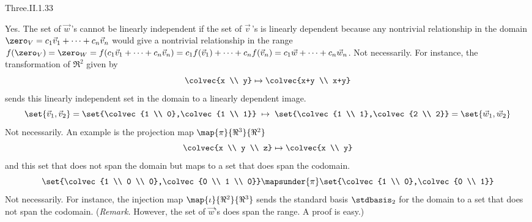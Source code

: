 \begin{ans}{Three.II.1.33}
      \begin{exparts}
        \partsitem Yes.
          The set of $\vec{w}\,$'s cannot be linearly independent if the
          set of $\vec{v}\,$'s is linearly dependent because
          any nontrivial relationship in the domain
          \( \zero_V=c_1\vec{v}_1+\dots+c_n\vec{v}_n \)
          would give a nontrivial relationship in the range
          \( f(\zero_V)=\zero_W=f(c_1\vec{v}_1+\dots+c_n\vec{v}_n)
             =c_1f(\vec{v}_1)+\dots+c_nf(\vec{v}_n)
             =c_1\vec{w}+\dots+c_n\vec{w}_n \).
        \partsitem Not necessarily.
          For instance, the transformation of \( \Re^2 \) given by
          \begin{equation*}
            \colvec{x \\ y} \mapsto \colvec{x+y \\ x+y}
          \end{equation*}
          sends this linearly independent set in the domain
          to a linearly dependent image.
          \begin{equation*}
            \set{\vec{v}_1,\vec{v}_2}=\set{\colvec{1 \\ 0},\colvec{1 \\ 1}}
            \;\mapsto\;
            \set{\colvec{1 \\ 1},\colvec{2 \\ 2}}=\set{\vec{w}_1,\vec{w}_2}
          \end{equation*}
        \partsitem Not necessarily.
          An example is the projection map
          \( \map{\pi}{\Re^3}{\Re^2} \)
          \begin{equation*}
            \colvec{x \\ y \\ z}\mapsto\colvec{x \\ y}
          \end{equation*}
          and this set that does not span the domain but
          maps to a set that does span the codomain.
          \begin{equation*}
            \set{\colvec{1 \\ 0 \\ 0},\colvec{0 \\ 1 \\ 0}}
            \mapsunder{\pi}\set{\colvec{1 \\ 0},\colvec{0 \\ 1}}
          \end{equation*}
        \partsitem Not necessarily.
          For instance, the injection map $\map{\iota}{\Re^2}{\Re^3}$ sends
          the standard basis $\stdbasis_2$ for the domain to a set that
          does not span
          the codomain.
          (\textit{Remark.}
          However, the set of $\vec{w}$'s does span the range.
          A proof is easy.)
      \end{exparts}
     
\end{ans}
